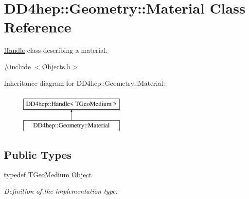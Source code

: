 \hypertarget{class_d_d4hep_1_1_geometry_1_1_material}{}\section{D\+D4hep\+:\+:Geometry\+:\+:Material Class Reference}
\label{class_d_d4hep_1_1_geometry_1_1_material}


\hyperlink{class_d_d4hep_1_1_handle}{Handle} class describing a material.  




{\ttfamily \#include $<$Objects.\+h$>$}

Inheritance diagram for D\+D4hep\+:\+:Geometry\+:\+:Material\+:\begin{figure}[H]
\begin{center}
\leavevmode
\includegraphics[height=2.000000cm]{class_d_d4hep_1_1_geometry_1_1_material}
\end{center}
\end{figure}
\subsection*{Public Types}
\begin{DoxyCompactItemize}
\item 
typedef T\+Geo\+Medium \hyperlink{class_d_d4hep_1_1_geometry_1_1_material_afdf167b558006f1bf7348fa5e812f4d8}{Object}
\begin{DoxyCompactList}\small\item\em Definition of the implementation type. \end{DoxyCompactList}\end{DoxyCompactItemize}
